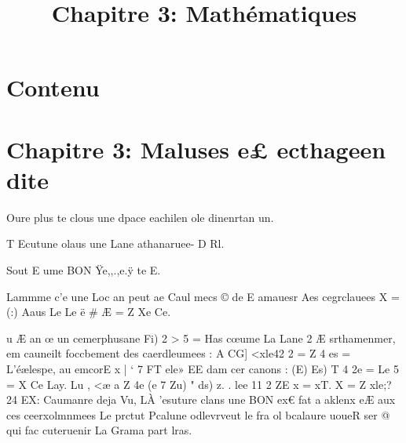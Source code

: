 \documentclass[12pt,a4paper]{article}
\title{Chapitre 3: Mathématiques}
\author{}
\date{}
\begin{document}
\maketitle

\section*{Contenu}

\section*{Chapitre 3: Maluses e£ ecthageen dite}


Oure plus te clous une dpace eachilen ole dinenrtan un.


T Ecutune olaus une Lane athanaruee- D Rl.

Sout E ume BON Ÿe,,.,e.ÿ te E.

Lammme c'e une Loc an peut ae Caul mecs © de E amauesr Aes cegrclauees X = (:) Aaus 
Le Le ë # Æ = Z Xe Ce.


u Æ an œ un cemerphusane Fi) 2 > 5 = 
Has cœume La Lane 2 Æ srthamenmer, em cauneilt foccbement des caerdleumees : 
A CG] <xle42 2 = Z 4 es = L'éælespe, au emcorE x | ‘ 7 FT ele» EE dam cer canons : (E) Es) T 4 2e = Le 5 = X Ce Lay. Lu , <æ a Z 4e (e 7 Zu) 
" 
ds) z. . lee 11 2 ZE x = xT. X = Z xle;? 
24 EX: 
Caumanre deja Vu, LÀ 'esuture clans une BON ex€ fat a aklenx eÆ aux ces ceerxolmnmees Le prctut Pcalune  odlevrveut le fra ol bcalaure uoueR ser @ qui fac cuteruenir La Grama part lras. 
\end{document}

